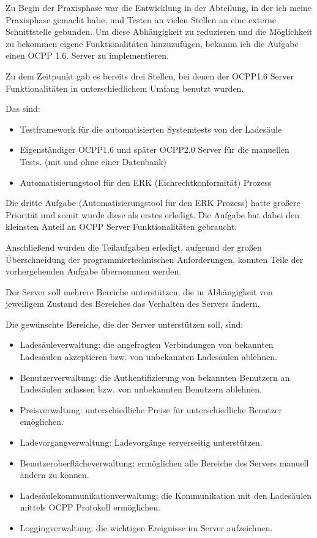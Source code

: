 Zu Begin der Praxisphase war die Entwicklung in der Abteilung, in der ich meine Praxisphase gemacht habe, und Testen an vielen Stellen an eine externe Schnittstelle gebunden.
Um diese Abhängigkeit zu reduzieren und die Möglichkeit zu bekommen eigene Funktionalitäten hinzuzufügen, bekamm ich die Aufgabe
einen OCPP 1.6. Server zu implementieren.

Zu dem Zeitpunkt gab es bereits drei Stellen, bei denen der OCPP1.6 Server Funktionalitäten in unterschiedlichem Umfang benutzt wurden.

Das sind:
\begin{itemize}
    \item Testframework für die automatisierten Systemtests von der Ladesäule
    \item Eigenständiger OCPP1.6 und später OCPP2.0 Server für die manuellen Tests. (mit und ohne einer Datenbank)
    \item Automatisierungstool für den ERK (Eichrechtkonformität) Prozess
\end{itemize}

Die dritte Aufgabe (Automatisierungstool für den ERK Prozess) hatte großere Priorität und somit wurde diese als erstes erledigt.
Die Aufgabe hat dabei den kleinsten Anteil an OCPP Server Funktionalitäten gebraucht.

Anschließend wurden die Teilaufgaben erledigt, aufgrund der großen Überschneidung der programmiertechnischen Anforderungen, 
konnten Teile der vorhergehenden Aufgabe übernommen werden.

Der Server soll mehrere Bereiche unterstützen, 
die in Abhängigkeit von jeweiligem Zustand des Bereiches das Verhalten des Servers ändern.

Die gewünschte Bereiche, die der Server unterstützen soll, sind:
\begin{itemize}
    \item Ladesäuleverwaltung: die angefragten Verbindungen von bekannten Ladesäulen akzeptieren bzw. von unbekannten Ladesäulen ablehnen.
    \item Benutzerverwaltung: die Authentifizierung von bekannten Benutzern an Ladesäulen zulassen bzw. von unbekannten Benutzern ablehnen.
    \item Preisverwaltung: unterschiedliche Preise für unterschiedliche Benutzer emöglichen.
    \item Ladevorgangverwaltung: Ladevorgänge serverseitig unterstützen.
    \item Benutzeroberflächeverwaltung: ermöglichen alle Bereiche des Servers manuell ändern zu können.
    \item Ladesäulekommunikationverwaltung: die Kommunikation mit den Ladesäulen mittels OCPP Protokoll ermöglichen.
    \item Loggingverwaltung: die wichtigen Ereignisse im Server aufzeichnen.
\end{itemize}